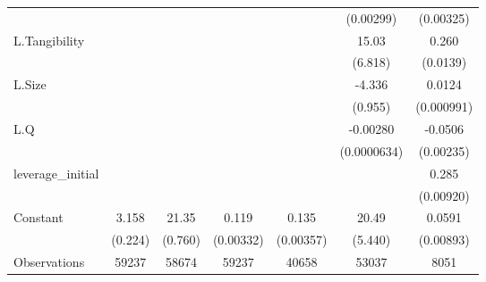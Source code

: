 {\begin{tabular}{l*{6}{c}}
                    &                     &                     &                     &                     &   (0.00299)         &   (0.00325)         \\
[1em]
L.Tangibility       &                     &                     &                     &                     &       15.03\sym{*}  &       0.260\sym{***}\\
                    &                     &                     &                     &                     &     (6.818)         &    (0.0139)         \\
[1em]
L.Size              &                     &                     &                     &                     &      -4.336\sym{***}&      0.0124\sym{***}\\
                    &                     &                     &                     &                     &     (0.955)         &  (0.000991)         \\
[1em]
L.Q                 &                     &                     &                     &                     &    -0.00280\sym{***}&     -0.0506\sym{***}\\
                    &                     &                     &                     &                     & (0.0000634)         &   (0.00235)         \\
[1em]
leverage\_initial    &                     &                     &                     &                     &                     &       0.285\sym{***}\\
                    &                     &                     &                     &                     &                     &   (0.00920)         \\
[1em]
Constant            &       3.158\sym{***}&       21.35\sym{***}&       0.119\sym{***}&       0.135\sym{***}&       20.49\sym{***}&      0.0591\sym{***}\\
                    &     (0.224)         &     (0.760)         &   (0.00332)         &   (0.00357)         &     (5.440)         &   (0.00893)         \\
\hline
Observations        &       59237         &       58674         &       59237         &       40658         &       53037         &        8051         \\
\hline\hline
\end{tabular}
}
